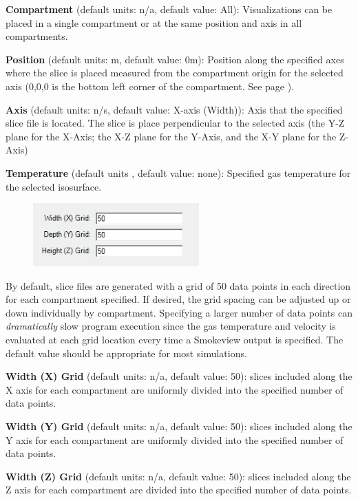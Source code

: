 \textbf{Compartment} (default units: n/a, default value: All): Visualizations can be placed in a single compartment or at the same position and axis in all compartments.

\textbf{Position} (default units: m, default value: 0m): Position along the specified axes where the slice is placed measured from the compartment origin for the selected axis (0,0,0 is the bottom left corner of the compartment. See page \pageref{Compartment_Geometry}).

\textbf{Axis} (default units: n/s, default value: X-axis (Width)): Axis that the specified slice file is located.  The slice is place perpendicular to the selected axis (the Y-Z plane for the X-Axis; the X-Z plane for the Y-Axis, and the X-Y plane for the Z-Axis)

\textbf{Temperature} (default units \degc, default value: none): Specified gas temperature for the selected isosurface.

\begin{figure}
  \includegraphics[width=2.511in]{FIGURES/Input_File/Visualizations_Resolution}
\end{figure}

By default, slice files are generated with a grid of 50 data points in each direction for each compartment specified. If desired, the grid spacing can be adjusted up or down individually by compartment. Specifying a larger number of data points can \textit{dramatically} slow program execution since the gas temperature and velocity is evaluated at each grid location every time a Smokeview output is specified.  The default value should be appropriate for most simulations.

\textbf{Width (X) Grid} (default units: n/a, default value: 50): slices included along the X axis for each compartment are uniformly divided into the specified number of data points.

\textbf{Width (Y) Grid} (default units: n/a, default value: 50): slices included along the Y axis for each compartment are uniformly divided into the specified number of data points.

\textbf{Width (Z) Grid} (default units: n/a, default value: 50): slices included along the Z axis for each compartment are divided into the specified number of data points.

